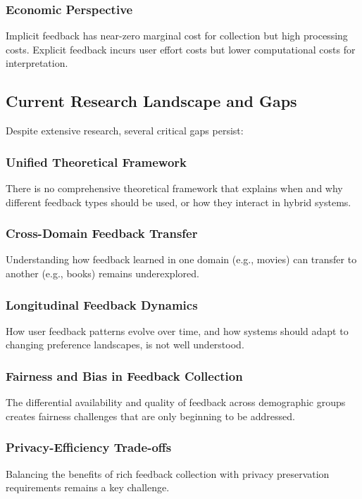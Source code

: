 \documentclass[acmsmall,review,anonymous]{acmart}
\begin{document}
\subsubsection{Economic Perspective}
Implicit feedback has near-zero marginal cost for collection but high processing costs. Explicit feedback incurs user effort costs but lower computational costs for interpretation.

\subsection{Current Research Landscape and Gaps}

Despite extensive research, several critical gaps persist:

\subsubsection{Unified Theoretical Framework}
There is no comprehensive theoretical framework that explains when and why different feedback types should be used, or how they interact in hybrid systems.

\subsubsection{Cross-Domain Feedback Transfer}
Understanding how feedback learned in one domain (e.g., movies) can transfer to another (e.g., books) remains underexplored.

\subsubsection{Longitudinal Feedback Dynamics}
How user feedback patterns evolve over time, and how systems should adapt to changing preference landscapes, is not well understood.

\subsubsection{Fairness and Bias in Feedback Collection}
The differential availability and quality of feedback across demographic groups creates fairness challenges that are only beginning to be addressed.

\subsubsection{Privacy-Efficiency Trade-offs}
Balancing the benefits of rich feedback collection with privacy preservation requirements remains a key challenge.
\end{document}
